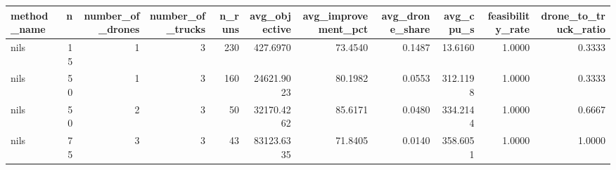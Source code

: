 \begin{tabular}{lrrrrrrrrrr}
\toprule
method_name & n & number_of_drones & number_of_trucks & n_runs & avg_objective & avg_improvement_pct & avg_drone_share & avg_cpu_s & feasibility_rate & drone_to_truck_ratio \\
\midrule
nils & 15 & 1 & 3 & 230 & 427.6970 & 73.4540 & 0.1487 & 13.6160 & 1.0000 & 0.3333 \\
nils & 50 & 1 & 3 & 160 & 24621.9023 & 80.1982 & 0.0553 & 312.1198 & 1.0000 & 0.3333 \\
nils & 50 & 2 & 3 & 50 & 32170.4262 & 85.6171 & 0.0480 & 334.2144 & 1.0000 & 0.6667 \\
nils & 75 & 3 & 3 & 43 & 83123.6335 & 71.8405 & 0.0140 & 358.6051 & 1.0000 & 1.0000 \\
\bottomrule
\end{tabular}
